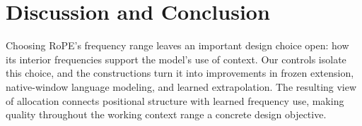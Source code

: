 \section{Discussion and Conclusion}
\label{sec:discussion}
Choosing RoPE's frequency range leaves an important design choice open:
how its interior frequencies support the model's use of context. Our controls
isolate this choice, and the constructions turn it into improvements in frozen
extension, native-window language modeling, and learned extrapolation. The
resulting view of allocation connects positional structure with learned
frequency use, making quality throughout the working context range a concrete
design objective.
\label{page:bodyend}
